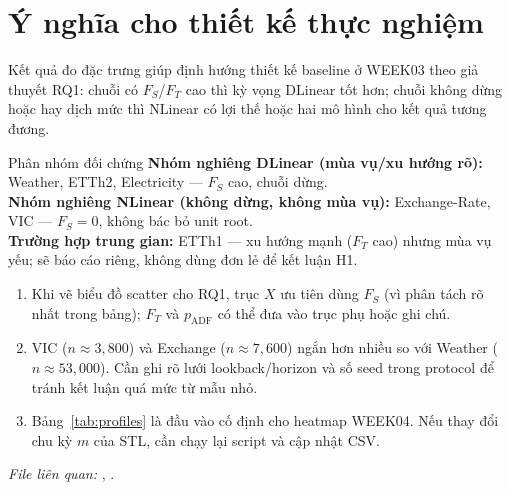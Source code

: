 \section{Ý nghĩa cho thiết kế thực nghiệm}
\label{sec:implications}

Kết quả đo đặc trưng giúp định hướng thiết kế baseline ở WEEK03 theo giả thuyết RQ1:
chuỗi có \(F_S\)/\(F_T\) cao thì kỳ vọng DLinear tốt hơn; chuỗi không dừng hoặc
hay dịch mức thì NLinear có lợi thế hoặc hai mô hình cho kết quả tương đương.

\begin{examplebox}{Phân nhóm đối chứng}
  \textbf{Nhóm nghiêng DLinear (mùa vụ/xu hướng rõ):}
  Weather, ETTh2, Electricity --- \(F_S\) cao, chuỗi dừng.\\[0.3em]
  \textbf{Nhóm nghiêng NLinear (không dừng, không mùa vụ):}
  Exchange-Rate, VIC --- \(F_S = 0\), không bác bỏ unit root.\\[0.3em]
  \textbf{Trường hợp trung gian:} ETTh1 --- xu hướng mạnh (\(F_T\) cao)
  nhưng mùa vụ yếu; sẽ báo cáo riêng, không dùng đơn lẻ để kết luận H1.
\end{examplebox}

\begin{enumerate}
  \item Khi vẽ biểu đồ scatter cho RQ1, trục \(X\) ưu tiên dùng \(F_S\)
        (vì phân tách rõ nhất trong bảng); \(F_T\) và \(p_{\mathrm{ADF}}\)
        có thể đưa vào trục phụ hoặc ghi chú.
  \item VIC (\(n \approx 3{,}800\)) và Exchange (\(n \approx 7{,}600\))
        ngắn hơn nhiều so với Weather (\(n \approx 53{,}000\)).
        Cần ghi rõ lưới lookback/horizon và số seed trong protocol
        để tránh kết luận quá mức từ mẫu nhỏ.
  \item Bảng~\ref{tab:profiles} là đầu vào cố định cho heatmap WEEK04.
        Nếu thay đổi chu kỳ \(m\) của STL, cần chạy lại script và cập nhật CSV.
\end{enumerate}

\vspace{0.5em}
\noindent\textit{File liên quan:}
,
.
